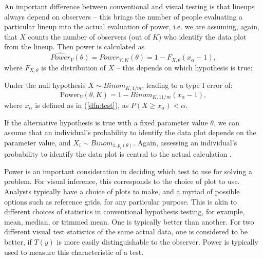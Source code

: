 \documentclass{article}
\newcommand{\red}[1]{{\color{red} #1}}
\newcommand{\hh}[1]{{\color{orange} #1}} %
\begin{document}
\hh{\noindent An important difference between conventional and visual testing  is that lineups always depend on observers -- this brings the number of people evaluating a particular lineup into the actual evaluation of power, i.e. we are assuming, again, that $X$ counts the number of observers (out of $K$) who identify the data plot from the lineup.
Then power is calculated as
\[
\widehat{Power}_{V} (\theta) = {Power}_{V, K} (\theta) = 1 - F_{X, \theta} (x_{\alpha} - 1),
\] 
where $F_{X, \theta}$ is the distribution of $X$ -- this depends on which hypothesis is true:

Under the null hypothesis $X \sim Binom_{K, 1/m}$, leading to a type I error of:
\[
\text{Power}_V(\theta, K)= 1 - Binom_{K, 11/m} (x_\alpha - 1),
\]
where $x_\alpha$ is defined as in (\ref{dfn:test}), as  $P(X \ge x_{\alpha}) < \alpha$.

If the alternative hypothesis is true with a fixed parameter value $\theta$, we can assume that an individual's probability to identify the data plot depends on the parameter value, and $X_i \sim Binom_{1, p_i(\theta)}$. Again, assessing an individual's probability to identify the data plot  is central to the actual calculation .
}


Power is an important consideration in deciding which test to use for solving a problem. %
For visual inference, this corresponds to the choice of plot to use. Analysts typically have a choice of plots to make, and a myriad of possible options such as reference grids, for any particular purpose. This is akin to different choices of statistics in conventional hypothesis testing, for example, mean, median, or trimmed mean. One is typically better than another. For two different visual test statistics of the same actual data, one is considered to be better, if $T(y)$ is more easily distinguishable to the observer. Power is typically used to measure this characteristic of a test. %
\end{document}
